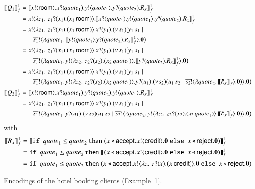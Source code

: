 \documentclass[preprint,11pt]{elsarticle}
\newcommand{\rtype}{\mathsf{room}}
\newcommand{\Quotev}{\mathit{quote}}
\newcommand{\accept}{\mathsf{accept}}
\newcommand{\reject}{\mathsf{reject}}
\newcommand{\creditc}{\mathsf{credit}}
\begin{document}
{{\begin{figure}[!t]
\begin{align*}
 \pmap{Q_1}{1}_f & = \pmap{\bout{x}{\rtype} \binp{x}{\Quotev_1} \bout{y}{\Quotev_1} \binp{y}{\Quotev_2} R_x}{1}_f
 \\
 & = \bout{x}{ \abs{z_1}{\,\binp{z_1}{x_1} (\appl{x_1}{\rtype})} } \pmap{\binp{x}{\Quotev_1} \bout{y}{\Quotev_1} \binp{y}{\Quotev_2} R_x}{1}_f \\
 & =  \bout{x}{ \abs{z_1}{\,\binp{z_1}{x_1} (\appl{x_1}{\rtype})} } \binp{x}{y_1} \newspb{s_1}{\appl{y_1}{s_1} \Par 
 \\
& \qquad  \bout{\dual{s_1}}{\abs{\Quotev_1}{\pmapp{\bout{y}{\Quotev_1} \binp{y}{\Quotev_2} R_x}{1}{f}}} \inact}
\\
 & =  \bout{x}{ \abs{z_1}{\,\binp{z_1}{x_1} (\appl{x_1}{\rtype})} } \binp{x}{y_1} \newspb{s_1}{\appl{y_1}{s_1} \Par 
 \\
& \qquad  \bout{\dual{s_1}}{\abs{\Quotev_1}{\bout{y}{ \abs{z_2}{\,\binp{z_2}{x_2} (\appl{x_2}{\Quotev_1})} }\pmapp{ \binp{y}{\Quotev_2} R_x}{1}{f}}} \inact}
 \\
 & =  \bout{x}{ \abs{z_1}{\,\binp{z_1}{x_1} (\appl{x_1}{\rtype})} } \binp{x}{y_1} \newspb{s_1}{\appl{y_1}{s_1} \Par 
 \\
& \qquad  \bout{\dual{s_1}}{\abs{\Quotev_1}{\bout{y}{ \abs{z_2}{\,\binp{z_2}{x_2} (\appl{x_2}{\Quotev_1})} }\binp{y}{u_1} \newsp{s_2}{\appl{u_1}{s_2} \Par \bout{\dual{s_2}}{\abs{\Quotev_2}{\pmapp{R_x}{1}{f}}} \inact}}} \inact}
\\
 \pmap{Q_2}{1}_f & = \pmap{\bout{x}{\rtype} \binp{x}{\Quotev_1}  \binp{y}{\Quotev_2} \bout{y}{\Quotev_1} R_x}{1}_f
 \\
& =  \bout{x}{ \abs{z_1}{\,\binp{z_1}{x_1} (\appl{x_1}{\rtype})} } \binp{x}{y_1} \newspb{s_1}{\appl{y_1}{s_1} \Par 
 \\
& \qquad  \bout{\dual{s_1}}{\abs{\Quotev_1}{\binp{y}{u_1} \newsp{s_2}{\appl{u_1}{s_2} \Par \bout{\dual{s_2}}{\abs{\Quotev_2}{\bout{y}{ \abs{z_2}{\,\binp{z_2}{x_2} (\appl{x_2}{\Quotev_1})} }\pmapp{R_x}{1}{f}}} \inact}}} \inact}
\end{align*}
with 
\begin{align*}
\pmapp{R_x}{1}{f} & =  \pmapp{\If\ \Quotev_1 \leq \Quotev_2 \, \Then  (\bsel{x}{\accept} \bout{x}{\creditc} \inact \  \Else \ \bsel{x}{\reject} \inact)}{1}{f}
\\
 & =  \If\ \Quotev_1 \leq \Quotev_2 \, \Then  \pmapp{(\bsel{x}{\accept} \bout{x}{\creditc} \inact \  \Else \ \bsel{x}{\reject} \inact)}{1}{f}
\\
 & =  \If\ \Quotev_1 \leq \Quotev_2 \, \Then  (\bsel{x}{\accept} \bout{x}{ \abs{z}{\,\binp{z}{x} (\appl{x}{\creditc})} }  \inact \  \Else \ \bsel{x}{\reject} \inact)
\end{align*}
\caption{Encodings of the hotel booking clients (Example~\ref{fig:hotel}). \label{ex:hotel}}
\label{fig:hotel}
\end{figure}


}}
\end{document}
